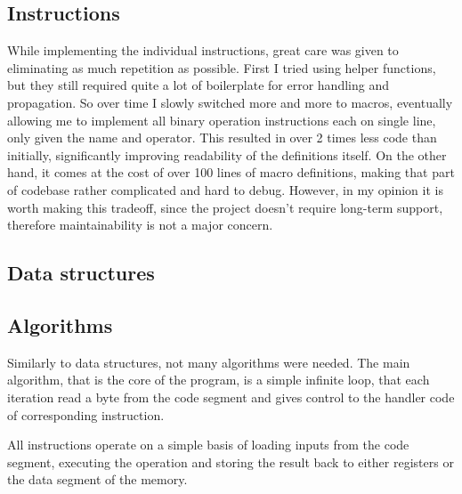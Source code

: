 \documentclass[12pt,a4paper]{paper}
\begin{document}
\subsection{Instructions}

While implementing the individual instructions, great care was given to
eliminating as much repetition as possible. First I tried using helper
functions, but they still required quite a lot of boilerplate for error handling
and propagation. So over time I slowly switched more and more to macros,
eventually allowing me to implement all binary operation instructions each on
single line, only given the name and operator. This resulted in over 2 times
less code than initially, significantly improving readability of the definitions
itself. On the other hand, it comes at the cost of over 100 lines of macro
definitions, making that part of codebase rather complicated and hard to debug.
However, in my opinion it is worth making this tradeoff, since the project
doesn't require long-term support, therefore maintainability is not a major
concern.

\subsection{Data structures}


\subsection{Algorithms}

Similarly to data structures, not many algorithms were needed. The main
algorithm, that is the core of the program, is a simple infinite loop, that each
iteration read a byte from the code segment and gives control to the handler
code of corresponding instruction. 

All instructions operate on a simple basis of loading inputs from the code
segment, executing the operation and storing the result back to either registers
or the data segment of the memory. 
\end{document}
